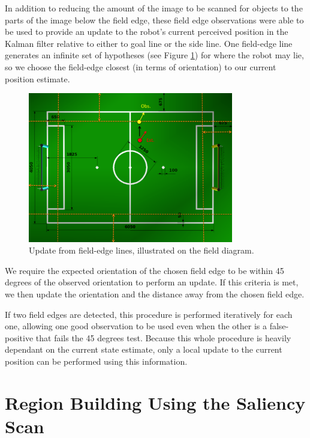\documentclass[runningheads,a4paper]{llncs}
\begin{document}
In addition to reducing the amount of the image to be scanned for objects to the parts of the image below the field edge, these field edge observations were able to be used to provide an update to the robot's current perceived position in the Kalman filter relative to either to goal line or the side line. One field-edge line generates an infinite set of hypotheses (see Figure \ref{figKFfieldEdgeUpdate}) for where the robot may lie, so we choose the field-edge closest (in terms of orientation) to our current position estimate.

\begin{figure} [ht]
\centering
\includegraphics[width=0.8\textwidth]{figures/KFfieldEdgeUpdate}
\caption{Update from field-edge lines, illustrated on the field diagram\cite{RobocupRules}.} \label{figKFfieldEdgeUpdate}
\end{figure}

We require the expected orientation of the chosen field edge to be within 45 degrees of the observed orientation to perform an update. If this criteria is met, we then update the orientation and the distance away from the chosen field edge.

If two field edges are detected, this procedure is performed iteratively for each one, allowing one good observation to be used even when the other is a false-positive that fails the 45 degrees test. Because this whole procedure is heavily dependant on the current state estimate, only a local update to the current position can be performed using this information.

\section{Region Building Using the Saliency Scan}
\end{document}
